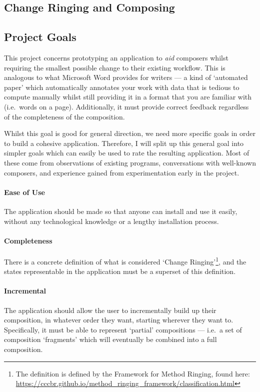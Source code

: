 \documentclass[12pt]{article}
\begin{document}
\subsection{Change Ringing and Composing}

\subsection{Project Goals}\label{sec:design-goals}

This project concerns prototyping an application to \emph{aid} composers whilst requiring the
smallest possible change to their existing workflow.  This is analogous to what Microsoft Word
provides for writers --- a kind of `automated paper' which automatically annotates your work with
data that is tedious to compute manually whilst still providing it in a format that you are familiar
with (i.e.\ words on a page).  Additionally, it must provide correct feedback regardless of the
completeness of the composition.

Whilst this goal is good for general direction, we need more specific goals in order to build a
cohesive application.  Therefore, I will split up this general goal into simpler goals which can
easily be used to rate the resulting application.  Most of these come from observations of existing
programs, conversations with well-known composers, and experience gained from experimentation early
in the project.

\paragraph{Ease of Use} The application should be made so that anyone can install and use it easily,
without any technological knowledge or a lengthy installation process.

\paragraph{Completeness} There is a concrete definition of what is considered `Change
Ringing'\footnote{The definition is defined by the Framework for Method Ringing, found here:
\url{https://cccbr.github.io/method_ringing_framework/classification.html}}, and the states
representable in the application must be a superset of this definition.

\paragraph{Incremental} The application should allow the user to incrementally build up their
composition, in whatever order they want, starting wherever they want to.  Specifically, it must
be able to represent `partial' compositions --- i.e.\ a set of composition `fragments' which will
eventually be combined into a full composition.
\end{document}
